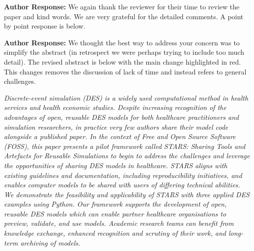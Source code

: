 \documentclass{article}
\begin{document}

\vspace{0.2cm}

\noindent\textbf{Author Response:} We again thank the reviewer for their time to review the paper and kind words. We are very grateful for the detailed comments.  A point by point response is below.

\vspace{0.5cm}


\vspace{0.2cm}

\noindent\textbf{Author Response:} We thought the best way to address your concern was to simplify the abstract (in retrospect we were perhaps trying to include too much detail). The revised abstract is below with the main change highlighted in red.  This changes removes the discussion of lack of time and instead refers to general challenges.  

\vspace{0.2cm}

\textit{Discrete-event simulation (DES) is a widely used computational method in health services and health economic studies. Despite increasing recognition of the advantages of open, reusable DES models for both healthcare practitioners and simulation researchers, in practice very few authors share their model code alongside a published paper. {\color{red}In the context of Free and Open Source Software (FOSS), this paper presents a pilot framework called STARS: Sharing Tools and Artefacts for Reusable Simulations to begin to address the challenges and leverage the opportunities of sharing DES models in healthcare.} STARS aligns with existing guidelines and documentation, including reproducibility initiatives, and enables computer models to be shared with users of differing technical abilities.  We demonstrate the feasibility and applicability of STARS with three applied DES examples using Python. Our framework supports the development of open, reusable DES models which can enable partner healthcare organisations to preview, validate, and use models. Academic research teams can benefit from knowledge exchange, enhanced recognition and scrutiny of their work, and long-term archiving of models.}
\end{document}
